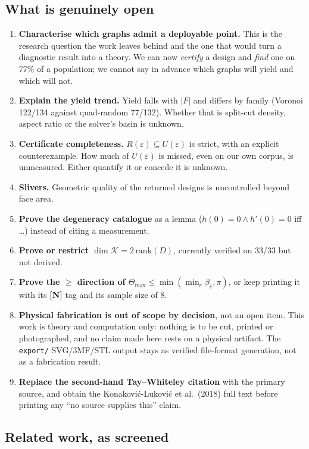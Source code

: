 \documentclass[11pt,a4paper]{article}
\theoremstyle{definition}
\newcommand{\Tmax}{\Theta_{\max}}
\newcommand{\file}[1]{\texttt{\small #1}}
\begin{document}
\subsection{What is genuinely open}

\begin{enumerate}\itemsep3pt
\item \textbf{Characterise which graphs admit a deployable point.} This is the research
question the work leaves behind and the one that would turn a diagnostic result into a theory.
We can now \emph{certify} a design and \emph{find} one on 77\% of a population; we cannot say
in advance which graphs will yield and which will not.
\item \textbf{Explain the yield trend.} Yield falls with $|F|$ and differs by family (Voronoi
122/134 against quad-random 77/132). Whether that is split-cut density, aspect ratio or the
solver's basin is unknown.
\item \textbf{Certificate completeness.} $R(\varepsilon)\subseteq U(\varepsilon)$ is strict,
with an explicit counterexample. How much of $U(\varepsilon)$ is missed, even on our own
corpus, is unmeasured. Either quantify it or concede it is unknown.
\item \textbf{Slivers.} Geometric quality of the returned designs is uncontrolled beyond face
area.
\item \textbf{Prove the degeneracy catalogue} as a lemma ($h(0)=0\wedge h'(0)=0$ iff \dots)
instead of citing a measurement.
\item \textbf{Prove or restrict $\dim\mathcal{K}=2\,\mathrm{rank}(D)$}, currently verified on
33/33 but not derived.
\item \textbf{Prove the $\ge$ direction of $\Tmax\le\min(\min_e\beta_e,\pi)$}, or keep printing
it with its \textbf{[N]} tag and its sample size of 8.
\item \textbf{Physical fabrication is out of scope by decision}, not an open item. This work
is theory and computation only: nothing is to be cut, printed or photographed, and no claim
made here rests on a physical artifact. The \file{export/} SVG/3MF/STL output stays as
verified file-format generation, not as a fabrication result.
\item \textbf{Replace the second-hand Tay--Whiteley citation} with the primary source, and
obtain the Konakovi\'c-Lukovi\'c et al.\ (2018) full text before printing any ``no source
supplies this'' claim.
\end{enumerate}

\subsection{Related work, as screened}
\end{document}
